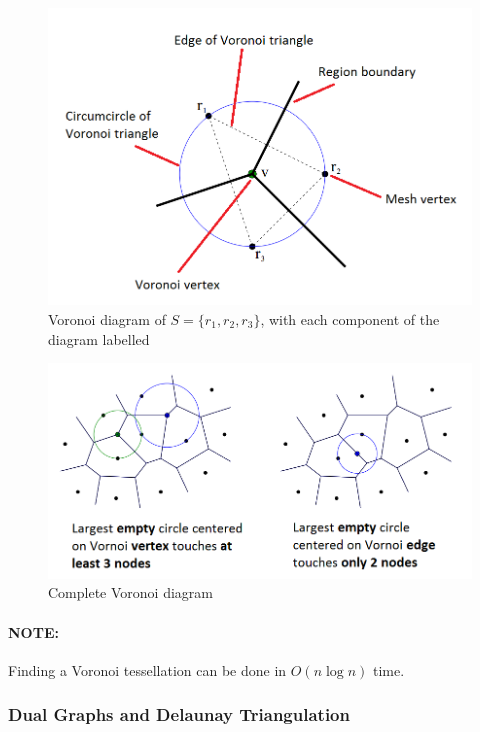 \documentclass{article}
\begin{document}
\begin{figure}
	\centering
	\includegraphics[scale=0.45]{figures/voronoi-vertex.png}
	\caption{Voronoi diagram of $S = \lbrace r_1, r_2, r_3 \rbrace$, with each component of the diagram labelled}
	\label{fig:voronoi-vertex}
\end{figure}

\begin{figure}
	\centering
	\includegraphics[scale=0.45]{figures/voronoi-diagram.png}
	\caption{Complete Voronoi diagram}
	\label{fig:voronoi-diagram}
\end{figure}

\paragraph{\textbf{NOTE:}} Finding a Voronoi tessellation can be done in $O(n \log n)$ time.

\subsubsection{Dual Graphs and Delaunay Triangulation}
\end{document}
